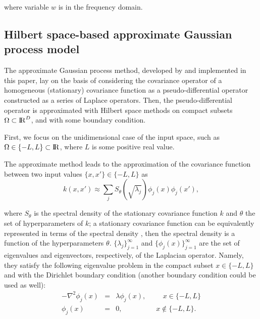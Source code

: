 \documentclass[]{interact}
\theoremstyle{plain}%
\theoremstyle{definition}
\theoremstyle{remark}
\begin{document}
\noindent where variable $w$ is in the frequency domain.


\subsection{Hilbert space-based approximate Gaussian process model}

The approximate Gaussian process method, developed by \cite{solin2018hilbert} and implemented in this paper, lay on the basis of considering the covariance operator of a homogeneous (stationary) covariance function as a pseudo-differential operator constructed as a series of Laplace operators. Then, the pseudo-differential operator is approximated with Hilbert space methods on compact subsets $\Omega \subset {\rm I\!R}^D$, and with some boundary condition. 

First, we focus on the unidimensional case of the input space, such as $\Omega \in \{-L,L\} \subset {\rm I\!R}$, where $L$ is some positive real value. 

\vspace{0.2cm}
The approximate method leads to the approximation of the covariance function between two input values $\{x,x'\} \in \{-L,L\}$ as 
%
\begin{equation}\label{approxcov}
k(x,x') \approx \sum_{j}S_{\theta}(\sqrt{\lambda_j}) \phi_j(x) \phi_j(x'),
\end{equation} 

\noindent where $S_{\theta}$ is the spectral density of the stationary covariance function $k$ and $\theta$ the set of hyperparameters of $k$; a stationary covariance function can be equivalently represented in terms of the spectral density \citep{rasmussen2006gaussian}, then the spectral density is a function of the hyperparameters $\theta$. $\{\lambda_j\}_{j=1}^{\infty}$ and $\{\phi_j(x)\}_{j=1}^{\infty}$ are the set of eigenvalues and eigenvectors, respectively, of the Laplacian operator. Namely, they satisfy the following eigenvalue problem in the compact subset $x \in \{-L,L\}$ and with the Dirichlet boundary condition (another boundary condition could be used as well):
%
\begin{eqnarray}\label{eigenproblem}
-\nabla^2 \phi_j(x)&=&\lambda \phi_j(x), \hspace{1cm}  x\in \{-L,L\} \nonumber \\ 
\phi_j(x)&=&0, \hspace{2cm} x\notin \{-L,L\}.
\end{eqnarray} 
\end{document}
